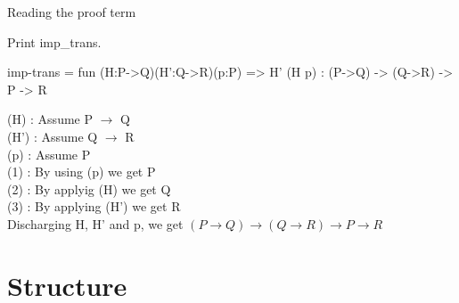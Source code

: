 \begin{frame}[fragile]{Reading the proof term}
	\begin{user}
		Print imp_trans.
	\end{user}
	\begin{coq}
		imp-trans = fun (H:P->Q)(H':Q->R)(p:P) => H' (H p)
		 : (P->Q) -> (Q->R) -> P -> R
	\end{coq}
	\pause
	(H) : Assume P $\rightarrow$ Q\\
	(H') : Assume Q $\rightarrow$ R\\
	(p) : Assume P\\
	(1) : By using (p) we get P\\
	(2) : By applyig (H) we get Q\\
	(3) : By applying (H') we get R\\
	\pause
	\medskip
	Discharging H, H' and p, we get $(P \rightarrow Q) \rightarrow (Q \rightarrow R) \rightarrow P \rightarrow R$
\end{frame}

\section{Structure}

